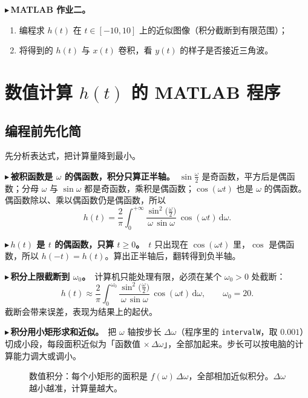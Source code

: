\documentclass[UTF8,a4paper,11pt]{ctexart}
\newcommand{\taxes}[5][t]{%
  \draw[->] (#2,0) -- (#3,0) node[right,font=\scriptsize] {$#1$};
  \draw[->] (0,#5) -- (0,#4);
  \node[anchor=north east,font=\tiny,gray!60!black,inner sep=1pt] at (0,-0.02) {$0$};}
\newcounter{ex}[section]
\newcommand{\point}[1]{\par\addvspace{1ex}\noindent\textcolor{ptteal}{$\blacktriangleright$\,\textbf{#1}}\ }
\begin{document}
\point{MATLAB 作业二。}
\begin{enumerate}[nosep]
\item 编程求 $h(t)$ 在 $t\in[-10,10]$ 上的近似图像（积分截断到有限范围）；
\item 将得到的 $h(t)$ 与 $x(t)$ 卷积，看 $y(t)$ 的样子是否接近三角波。
\end{enumerate}

\section{数值计算 \texorpdfstring{$h(t)$}{h(t)} 的 MATLAB 程序}\label{sec:matlab}

\subsection{编程前先化简}
先分析表达式，把计算量降到最小。

\point{被积函数是 $\omega$ 的偶函数，积分只算正半轴。}$\sin\frac{\omega}{2}$ 是奇函数，平方后是偶函数；分母 $\omega$ 与 $\sin\omega$ 都是奇函数，乘积是偶函数；$\cos(\omega t)$ 也是 $\omega$ 的偶函数。偶函数除以、乘以偶函数仍是偶函数，所以
\[
h(t)=\frac2\pi\int_{0}^{+\infty}\frac{\sin^2\!\big(\frac{\omega}{2}\big)}{\omega\,\sin\omega}\,\cos(\omega t)\,\mathrm{d}\omega .
\]
\point{$h(t)$ 是 $t$ 的偶函数，只算 $t\ge0$。}$t$ 只出现在 $\cos(\omega t)$ 里，$\cos$ 是偶函数，所以 $h(-t)=h(t)$。算出正半轴后，翻转得到负半轴。

\point{积分上限截断到 $\omega_0$。}计算机只能处理有限，必须在某个 $\omega_0>0$ 处截断：
\[
h(t)\approx\frac2\pi\int_{0}^{\omega_0}\frac{\sin^2\!\big(\frac{\omega}{2}\big)}{\omega\,\sin\omega}\,\cos(\omega t)\,\mathrm{d}\omega ,\qquad \omega_0=20 .
\]
截断会带来误差，表现为结果上的起伏。

\point{积分用小矩形求和近似。}把 $\omega$ 轴按步长 $\Delta\omega$（程序里的 \texttt{intervalW}，取 $0.001$）切成小段，每段面积近似为「函数值 $\times\,\Delta\omega$」，全部加起来。步长可以按电脑的计算能力调大或调小。

\begin{figure}[H]
\centering
{}
\caption{数值积分：每个小矩形的面积是 $f(\omega)\,\Delta\omega$，全部相加近似积分。$\Delta\omega$ 越小越准，计算量越大。}
\end{figure}
\end{document}
